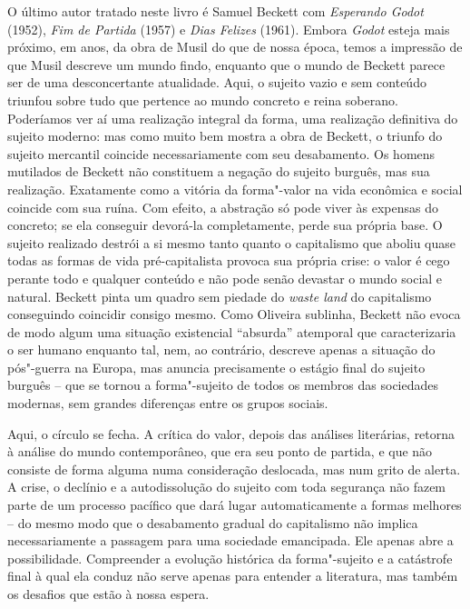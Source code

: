 O último autor tratado neste livro é Samuel Beckett com \emph{Esperando
Godot} (1952), \emph{Fim de Partida} (1957) e \emph{Dias Felizes}
(1961). Embora \emph{Godot} esteja mais próximo, em anos, da obra de
Musil do que de nossa época, temos a impressão de que Musil descreve um
mundo findo, enquanto que o mundo de Beckett parece ser de uma
desconcertante atualidade. Aqui, o sujeito vazio e sem conteúdo triunfou
sobre tudo que pertence ao mundo concreto e reina soberano. Poderíamos
ver aí uma realização integral da forma, uma realização definitiva do
sujeito moderno: mas como muito bem mostra a obra de Beckett, o triunfo
do sujeito mercantil coincide necessariamente com seu desabamento. Os
homens mutilados de Beckett não constituem a negação do sujeito burguês,
mas sua realização. Exatamente como a vitória da forma"-valor na vida
econômica e social coincide com sua ruína. Com efeito, a abstração só
pode viver às expensas do concreto; se ela conseguir devorá-la
completamente, perde sua própria base. O sujeito realizado destrói a si
mesmo tanto quanto o capitalismo que aboliu quase todas as formas de
vida pré-capitalista provoca sua própria crise: o valor é cego perante
todo e qualquer conteúdo e não pode senão devastar o mundo social e
natural. Beckett pinta um quadro sem piedade do \emph{waste land} do
capitalismo conseguindo coincidir consigo mesmo. Como Oliveira sublinha,
Beckett não evoca de modo algum uma situação existencial ``absurda''
atemporal que caracterizaria o ser humano enquanto tal, nem, ao
contrário, descreve apenas a situação do pós"-guerra na Europa, mas
anuncia precisamente o estágio final do sujeito burguês -- que se tornou
a forma"-sujeito de todos os membros das sociedades modernas, sem grandes
diferenças entre os grupos sociais.

Aqui, o círculo se fecha. A crítica do valor, depois das análises
literárias, retorna à análise do mundo contemporâneo, que era seu ponto
de partida, e que não consiste de forma alguma numa consideração
deslocada, mas num grito de alerta. A crise, o declínio e a
autodissolução do sujeito com toda segurança não fazem parte de um
processo pacífico que dará lugar automaticamente a formas melhores -- do
mesmo modo que o desabamento gradual do capitalismo não implica
necessariamente a passagem para uma sociedade emancipada. Ele apenas
abre a possibilidade. Compreender a evolução histórica da forma"-sujeito
e a catástrofe final à qual ela conduz não serve apenas para entender a
literatura, mas também os desafios que estão à nossa espera.

